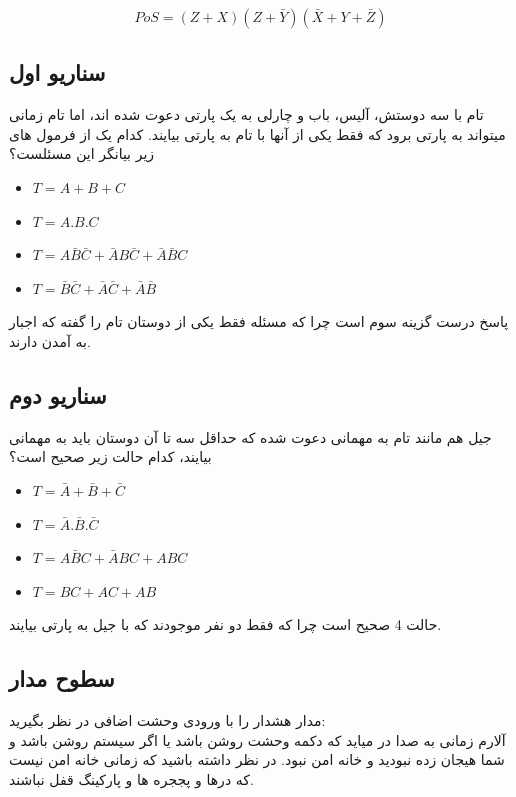 \documentclass[20pt, a4paper]{article}
\begin{document}
\begin{equation}
	PoS= (Z+X)(Z+\bar{Y})(\bar{X}+Y+\bar{Z})
\end{equation}




\subsection{سناریو اول}
تام با سه دوستش، آلیس، باب و چارلی به یک پارتی
دعوت شده اند، اما تام زمانی میتواند به پارتی برود 
که فقط یکی از آنها با تام به پارتی بیایند. کدام یک 
از فرمول های زیر بیانگر این مسئلست؟
\begin{LTR}
	\begin{itemize}
		\item $T = A + B + C$
		\item $T = A . B . C$
		\item $T = A\bar{B}\bar{C} + \bar{A}B\bar{C} + \bar{A}\bar{B}C$ 
		\item $T = \bar{B}\bar{C} + \bar{A}\bar{C} + \bar{A}\bar{B}$ 
	\end{itemize}
\end{LTR}
پاسخ درست گزینه سوم است چرا که مسئله فقط یکی از دوستان تام را گفته که
اجبار به آمدن دارند.

\subsection{سناریو دوم}
جیل هم مانند تام به مهمانی دعوت شده 
که حداقل سه تا آن دوستان باید به مهمانی بیایند، کدام حالت زیر صحیح است؟

\begin{LTR}
	\begin{itemize}
		\item $T = \bar{A} + \bar{B} + \bar{C}$
		\item $T =\bar{A} . \bar{B} . \bar{C}$
		\item $T = A\bar{B}C + \bar{A}BC + ABC$ 
		\item $T = BC + AC + AB$ 
	\end{itemize}
\end{LTR}
حالت 4 صحیح است چرا که فقط دو نفر موجودند که با جیل به پارتی بیایند.

\subsection{سطوح مدار}
مدار هشدار را با ورودی وحشت اضافی در نظر بگیرید:\\
آلارم زمانی به صدا در میاید که دکمه وحشت روشن باشد
یا اگر سیستم روشن باشد و شما هیجان زده نبودید و خانه امن نبود.
 در نظر داشته باشید که زمانی خانه امن نیست که درها و پججره ها و پارکینگ
 قفل نباشند.
\end{document}
